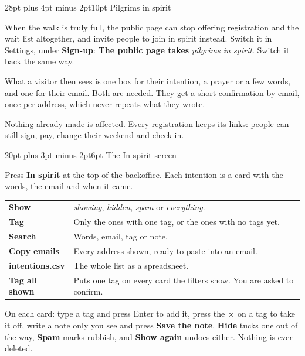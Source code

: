 \documentclass[12pt]{article}
\makeatletter
\renewcommand\section{\@startsection{section}{1}{0pt}%
  {28pt plus 4pt minus 2pt}{10pt}%
  {\normalfont\Large\bfseries\color{accent}}}
\renewcommand\subsection{\@startsection{subsection}{2}{0pt}%
  {20pt plus 3pt minus 2pt}{6pt}%
  {\normalfont\large\bfseries\color{ink}}}
\newcommand{\btn}[1]{\textbf{#1}}
\makeatother
\begin{document}
\section{Pilgrims in spirit}\label{sec:spirit}

When the walk is truly full, the public page can stop offering
registration and the wait list altogether, and invite people to join in
spirit instead. Switch it in Settings, under \btn{Sign-up}: \btn{The
public page takes} \textit{pilgrims in spirit}. Switch it back the same
way.

What a visitor then sees is one box for their intention, a prayer or a
few words, and one for their email. Both are needed. They get a short
confirmation by email, once per address, which never repeats what they
wrote.

Nothing already made is affected. Every registration keeps its links:
people can still sign, pay, change their weekend and check in.

\subsection{The In spirit screen}

Press \btn{In spirit} at the top of the backoffice. Each intention is a
card with the words, the email and when it came.

\begin{tabularx}{\linewidth}{@{}L{1.6in}Y@{}}
\toprule
\btn{Show} & \textit{showing}, \textit{hidden}, \textit{spam} or
\textit{everything}. \\[5pt]
\btn{Tag} & Only the ones with one tag, or the ones with no tags yet. \\[5pt]
\btn{Search} & Words, email, tag or note. \\[5pt]
\btn{Copy emails} & Every address shown, ready to paste into an
email. \\[5pt]
\btn{intentions.csv} & The whole list as a spreadsheet. \\[5pt]
\btn{Tag all shown} & Puts one tag on every card the filters show. You
are asked to confirm. \\
\bottomrule
\end{tabularx}

On each card: type a tag and press Enter to add it, press the
\textbf{×} on a tag to take it off, write a note only you see and press
\btn{Save the note}. \btn{Hide} tucks one out of the way, \btn{Spam}
marks rubbish, and \btn{Show again} undoes either. Nothing is ever
deleted.
\end{document}
